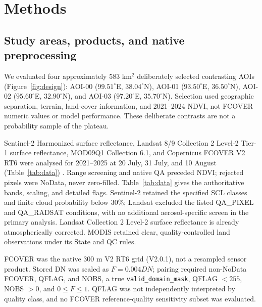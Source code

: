\section{Methods}
\subsection{Study areas, products, and native preprocessing}
We evaluated four approximately 583 km$^2$ deliberately selected contrasting AOIs (Figure~\ref{fig:design}): AOI-00 ($99.51^{\circ}$E, $38.04^{\circ}$N), AOI-01 ($93.50^{\circ}$E, $36.50^{\circ}$N), AOI-02 ($95.60^{\circ}$E, $32.90^{\circ}$N), and AOI-03 ($97.20^{\circ}$E, $35.70^{\circ}$N). Selection used geographic separation, terrain, land-cover information, and 2021--2024 NDVI, not FCOVER numeric values or model performance. These deliberate contrasts are not a probability sample of the plateau.

Sentinel-2 Harmonized surface reflectance, Landsat 8/9 Collection 2 Level-2 Tier-1 surface reflectance, MOD09Q1 Collection 6.1, and Copernicus FCOVER V2 RT6 were analysed for 2021--2025 at 20 July, 31 July, and 10 August (Table~\ref{tab:data}) \citep{esa2015sentinel,s2harmonized,s2products,s2processing,usgslandsat,landsatscale,landsatqa,nasamodis,mod09c61}. Range screening and native QA preceded NDVI; rejected pixels were NoData, never zero-filled. Table~\ref{tab:data} gives the authoritative bands, scaling, and detailed flags. Sentinel-2 retained the specified SCL classes and finite cloud probability below 30\%; Landsat excluded the listed QA\_PIXEL and QA\_RADSAT conditions, with no additional aerosol-specific screen in the primary analysis. Landsat Collection 2 Level-2 surface reflectance is already atmospherically corrected. MODIS retained clear, quality-controlled land observations under its State and QC rules.

FCOVER was the native 300 m V2 RT6 grid (V2.0.1), not a resampled sensor product. Stored DN was scaled as $F=0.004DN$; pairing required non-NoData FCOVER, QFLAG, and NOBS, a true \texttt{valid\_domain\_mask}, QFLAG $<255$, NOBS $>0$, and $0\le F\le1$. QFLAG was not independently interpreted by quality class, and no FCOVER reference-quality sensitivity subset was evaluated.



